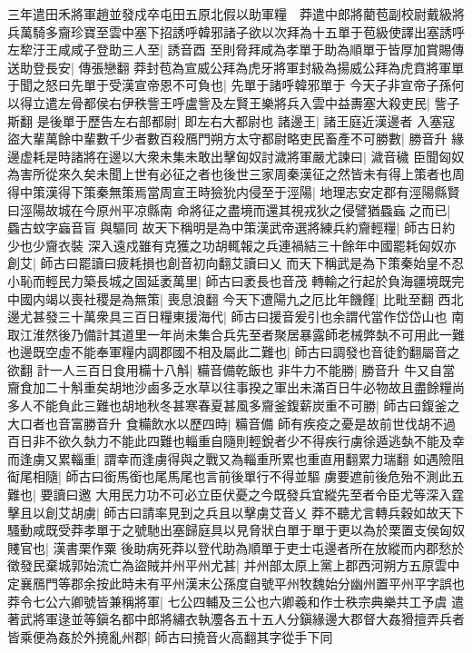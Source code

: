 三年遣田禾將軍趙並發戍卒屯田五原北假以助軍糧　莽遣中郎將藺苞副校尉戴級將兵萬騎多齎珍寶至雲中塞下招誘呼韓邪諸子欲以次拜為十五單于苞級使譯出塞誘呼左犂汙王咸咸子登助三人至|{
	誘音酉}
至則脅拜咸為孝單于助為順單于皆厚加賞賜傳送助登長安|{
	傳張戀翻}
莽封苞為宣威公拜為虎牙將軍封級為揚威公拜為虎賁將軍單于聞之怒曰先單于受漢宣帝恩不可負也|{
	先單于諸呼韓邪單于}
今天子非宣帝子孫何以得立遣左骨都侯右伊秩訾王呼盧訾及左賢王樂將兵入雲中益夀塞大殺吏民|{
	訾子斯翻}
是後單于歷告左右部都尉|{
	即左右大都尉也}
諸邊王|{
	諸王庭近漢邊者}
入塞寇盜大輩萬餘中輩數千少者數百殺鴈門朔方太守都尉略吏民畜產不可勝數|{
	勝音升}
緣邊虚耗是時諸將在邊以大衆未集未敢出擊匈奴討濊將軍嚴尤諫曰|{
	濊音穢}
臣聞匈奴為害所從來久矣未聞上世有必征之者也後世三家周秦漢征之然皆未有得上策者也周得中策漢得下策秦無策焉當周宣王時獫狁内侵至于涇陽|{
	地理志安定郡有涇陽縣賢曰涇陽故城在今原州平凉縣南}
命將征之盡境而還其視戎狄之侵譬猶蟁蝱之而已|{
	蟁古蚊字蝱音盲與驅同}
故天下稱明是為中策漢武帝選將練兵約齎輕糧|{
	師古日約少也少齎衣裝}
深入遠戍雖有克獲之功胡輒報之兵連禍結三十餘年中國罷耗匈奴亦創艾|{
	師古曰罷讀曰疲耗損也創音初向翻艾讀曰乂}
而天下稱武是為下策秦始皇不忍小恥而輕民力築長城之固延袤萬里|{
	師古曰袤長也音茂}
轉輸之行起於負海疆境既完中國内竭以喪社稷是為無策|{
	喪息浪翻}
今天下遭陽九之厄比年饑饉|{
	比毗至翻}
西北邊尤甚發三十萬衆具三百日糧東援海代|{
	師古曰援音爰引也余謂代當作岱岱山也}
南取江淮然後乃備計其道里一年尚未集合兵先至者聚居暴露師老械弊埶不可用此一難也邊既空虛不能奉軍糧内調郡國不相及屬此二難也|{
	師古曰調發也音徒釣翻屬音之欲翻}
計一人三百日食用糒十八斛|{
	糒音備乾飯也}
非牛力不能勝|{
	勝音升}
牛又自當齎食加二十斛重矣胡地沙鹵多乏水草以往事揆之軍出未滿百日牛必物故且盡餘糧尚多人不能負此三難也胡地秋冬甚寒春夏甚風多齎釜鍑薪炭重不可勝|{
	師古曰鍑釜之大口者也音富勝音升}
食糒飲水以歷四時|{
	糒音備}
師有疾疫之憂是故前世伐胡不過百日非不欲久埶力不能此四難也輜重自隨則輕銳者少不得疾行虜徐遁逃埶不能及幸而逢虜又累輜重|{
	謂幸而逢虜得與之戰又為輜重所累也重直用翻累力瑞翻}
如遇險阻䘖尾相隨|{
	師古曰銜馬銜也尾馬尾也言前後單行不得並驅}
虜要遮前後危殆不測此五難也|{
	要讀曰邀}
大用民力功不可必立臣伏憂之今既發兵宜縱先至者令臣尤等深入霆擊且以創艾胡虜|{
	師古曰請率見到之兵且以擊虜艾音乂}
莽不聽尤言轉兵穀如故天下騷動咸既受莽孝單于之號馳出塞歸庭具以見脅狀白單于單于更以為於栗置支侯匈奴賤官也|{
	漢書栗作粟}
後助病死莽以登代助為順單于吏士屯邊者所在放縱而内郡愁於徵發民棄城郭始流亡為盜賊并州平州尤甚|{
	并州部太原上黨上郡西河朔方五原雲中定襄鴈門等郡余按此時未有平州漢末公孫度自號平州牧魏始分幽州置平州平字誤也}
莽令七公六卿號皆兼稱將軍|{
	七公四輔及三公也六卿羲和作士秩宗典樂共工予虞}
遣著武將軍逯並等鎭名都中郎將繡衣執灋各五十五人分鎭緣邊大郡督大姦猾擅弄兵者皆乘便為姦於外撓亂州郡|{
	師古曰撓音火高翻其字從手下同}
